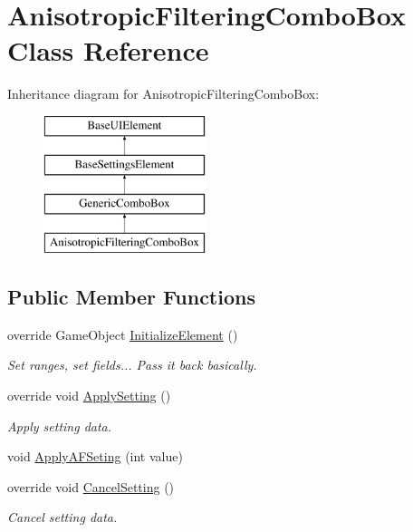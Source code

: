\hypertarget{class_anisotropic_filtering_combo_box}{}\section{Anisotropic\+Filtering\+Combo\+Box Class Reference}
\label{class_anisotropic_filtering_combo_box}
Inheritance diagram for Anisotropic\+Filtering\+Combo\+Box\+:\begin{figure}[H]
\begin{center}
\leavevmode
\includegraphics[height=4.000000cm]{class_anisotropic_filtering_combo_box}
\end{center}
\end{figure}
\subsection*{Public Member Functions}
\begin{DoxyCompactItemize}
\item 
override Game\+Object \hyperlink{class_anisotropic_filtering_combo_box_a3a3182ef43ee5c56158e41c750329ab5}{Initialize\+Element} ()
\begin{DoxyCompactList}\small\item\em Set ranges, set fields... Pass it back basically. \end{DoxyCompactList}\item 
override void \hyperlink{class_anisotropic_filtering_combo_box_a6125f1d23556243c2b50ff1063cd8a3b}{Apply\+Setting} ()
\begin{DoxyCompactList}\small\item\em Apply setting data. \end{DoxyCompactList}\item 
void \hyperlink{class_anisotropic_filtering_combo_box_a1fcf854f7e45693cd3df92fc2c269453}{Apply\+A\+F\+Seting} (int value)
\item 
override void \hyperlink{class_anisotropic_filtering_combo_box_ae2c2cdc46f898319f43eff20acd32b6f}{Cancel\+Setting} ()
\begin{DoxyCompactList}\small\item\em Cancel setting data. \end{DoxyCompactList}\end{DoxyCompactItemize}
